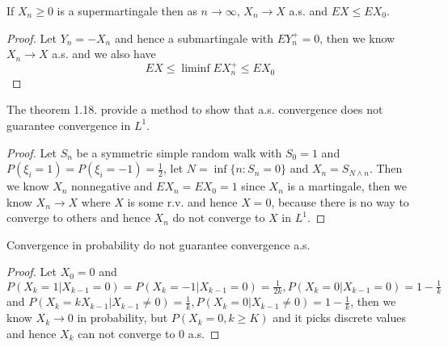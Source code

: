 \documentclass[lang=en, color=blue, ]{elegantbook}
\begin{document}
\begin{theorem}
    If $X_n\geq 0$ is a supermartingale then as $n\to\infty$, $X_n\to X$ a.s. and $EX\leq EX_0$.
\end{theorem}
\begin{proof}
    Let $Y_n = -X_n$ and hence a submartingale with $EY_n^+ = 0$, then we know $X_n \to X$ a.s. and we also have
    \[EX \leq \liminf EX_n^+ \leq EX_0\] 
\end{proof}

\begin{proposition}
    The theorem 1.18. provide a method to show that a.s. convergence does not guarantee convergence in $L^1$.
\end{proposition}
\begin{proof}
Let $S_n$ be a symmetric simple random walk with $S_0 = 1$ and $P(\xi_i=1) = P(\xi_i = -1) = \tfrac{1}{2}$, let $N = \inf\{n: S_n = 0\}$ and $X_n = S_{N\wedge n}$. Then we know $X_n$ nonnegative and $EX_n = EX_0=1$ since $X_n$ is a martingale, then we know $X_n \to X$ where $X$ is some r.v. and hence $X = 0$, because there is no way to converge to others and hence $X_n$ do not converge to $X$ in $L^1$.
\end{proof}

\begin{proposition}
    Convergence in probability do not guarantee convergence a.s.
\end{proposition}
\begin{proof}
    Let $X_0 = 0$ and $P(X_k = 1|X_{k-1} = 0) = P(X_k = -1|X_{k-1} = 0) = \tfrac{1}{2k}, P(X_k = 0|X_{k-1} = 0) = 1-\tfrac{1}{k}$ and $P(X_k = kX_{k-1}|X_{k-1} \neq 0) = \tfrac{1}{k}, P(X_k = 0|X_{k-1} \neq 0) = 1-\tfrac{1}{k}$, then we know $X_k \to 0$ in probability, but $P(X_k = 0, k\geq K)$ and it picks discrete values and hence $X_k$ can not converge to $0$ a.s. 
\end{proof}
\end{document}

